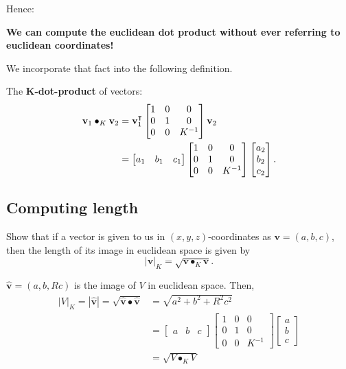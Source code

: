 \documentclass[newpage,hints,handout,12pt,noauthor,nooutcomes]{ximera}
\begin{document}
Hence:
\begin{center}
\textbf{We can compute the euclidean dot product without ever referring to euclidean coordinates!}
\end{center}
We incorporate that fact into the following definition.

\begin{definition}
The \textbf{$\boldsymbol{K}$-dot-product} of vectors:%
\begin{align*}
\mathbf{v}_{1}\bullet_{K}\mathbf{v}_{2}  &=\mathbf{v}_{1}^\transpose
\begin{bmatrix}
1 & 0 & 0\\
0 & 1 & 0\\
0 & 0 & K^{-1}%
\end{bmatrix}
\mathbf{v}_{2}\\
&=
\begin{bmatrix}
a_{1} & b_{1} & c_{1}%
\end{bmatrix}
\begin{bmatrix}
1 & 0 & 0\\
0 & 1 & 0\\
0 & 0 & K^{-1}%
\end{bmatrix}
\begin{bmatrix}
a_{2}\\
b_{2}\\
c_{2}%
\end{bmatrix}.
\end{align*}

\end{definition}

\subsection{Computing length}

\begin{problem}
  Show that if a vector is given to us in $(x,y,z)$-coordinates as
  $\mathbf{v}=(a,b,c)$, then the length of its image in euclidean
  space is given by
  \[
  |\mathbf{v}|_K=\sqrt{\mathbf{v} \bullet_K \mathbf{v}}.
  \]
\begin{freeResponse}
$\hat{\mathbf v} = \left(a,b,Rc \right)$ is the image of $V$ in euclidean space. Then,
\begin{align*}
|V|_K = |\hat{\mathbf v}| = \sqrt{\hat{\mathbf v}\bullet\hat{\mathbf v}} 
&= \sqrt{a^{2} + b^{2} + R^{2}c^{2}} \\
&= \begin{bmatrix}
a & b & c%
\end{bmatrix}
\begin{bmatrix}
1 & 0 & 0\\
0 & 1 & 0\\
0 & 0 & K^{-1}%
\end{bmatrix}
\begin{bmatrix}
a\\
b\\
c%
\end{bmatrix} \\
&= \sqrt{V\bullet_K V}
\end{align*}
\end{freeResponse} 
\end{problem}
\end{document}
